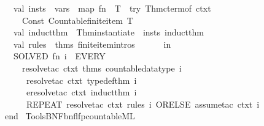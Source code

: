 \begin{isabellebody}
\ \ \ \ \ \ \ \ val\ insts\ {\isacharequal}\ vars\ {\isacharbar}{\isachargreater}\ map\ {\isacharparenleft}fn\ {\isacharparenleft}{\isacharunderscore}{\isacharcomma}\ T{\isacharparenright}\ {\isacharequal}{\isachargreater}\ try\ {\isacharparenleft}Thm{\isachardot}cterm{\isacharunderscore}of\ ctxt{\isacharparenright}\isanewline
\ \ \ \ \ \ \ \ \ \ {\isacharparenleft}Const\ {\isacharparenleft}\isactrlconstUNDERSCOREname {\isasymopen}Countable{\isachardot}finite{\isacharunderscore}item{\isasymclose}{\isacharcomma}\ T{\isacharparenright}{\isacharparenright}{\isacharparenright}\isanewline
\ \ \ \ \ \ \ \ val\ induct{\isacharunderscore}thm{\isacharprime}\ {\isacharequal}\ Thm{\isachardot}instantiate{\isacharprime}\ {\isacharbrackleft}{\isacharbrackright}\ insts\ induct{\isacharunderscore}thm\isanewline
\ \ \ \ \ \ \ \ val\ rules\ {\isacharequal}\ {\isacharat}{\isacharbraceleft}thms\ finite{\isacharunderscore}item{\isachardot}intros{\isacharbraceright}\isanewline
\ \ \ \ \ \ in\isanewline
\ \ \ \ \ \ \ \ SOLVED{\isacharprime}\ {\isacharparenleft}fn\ i\ {\isacharequal}{\isachargreater}\ EVERY\isanewline
\ \ \ \ \ \ \ \ \ \ {\isacharbrackleft}resolve{\isacharunderscore}tac\ ctxt\ {\isacharat}{\isacharbraceleft}thms\ countable{\isacharunderscore}datatype{\isacharbraceright}\ i{\isacharcomma}\isanewline
\ \ \ \ \ \ \ \ \ \ \ resolve{\isacharunderscore}tac\ ctxt\ {\isacharbrackleft}typedef{\isacharunderscore}thm{\isacharbrackright}\ i{\isacharcomma}\isanewline
\ \ \ \ \ \ \ \ \ \ \ eresolve{\isacharunderscore}tac\ ctxt\ {\isacharbrackleft}induct{\isacharunderscore}thm{\isacharprime}{\isacharbrackright}\ i{\isacharcomma}\isanewline
\ \ \ \ \ \ \ \ \ \ \ REPEAT\ {\isacharparenleft}resolve{\isacharunderscore}tac\ ctxt\ rules\ i\ ORELSE\ assume{\isacharunderscore}tac\ ctxt\ i{\isacharparenright}{\isacharbrackright}{\isacharparenright}\ {}\isanewline
\ \ \ \ \ \ end{\isacharparenright}\isanewline
{\isacartoucheclose}%
\endisatagML
{\isafoldML}%
%
\isadelimML
\isanewline
%
\endisadelimML
\isanewline
{}\isamarkupfalse%
%
\isadelimdocument
%
\endisadelimdocument
%
\isatagdocument
%
\isamarkuptrue%
%
\endisatagdocument
{\isafolddocument}%
%
\isadelimdocument
%
\endisadelimdocument
%
\isadelimML
%
\endisadelimML
%
\isatagML
{}\isamarkupfalse%
\ {\isacartoucheopen}{\isachardot}{\isachardot}{\isacharslash}Tools{\isacharslash}BNF{\isacharslash}bnf{\isacharunderscore}lfp{\isacharunderscore}countable{\isachardot}ML{\isacartoucheclose}\isanewline
\isanewline

\end{isabellebody}
